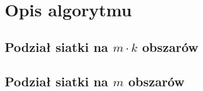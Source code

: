 \newpage


\section{Opis algorytmu}

\newpage
\subsection{Podział siatki na $m \cdot k$ obszarów}

\newpage

\newpage

\newpage

\newpage

\newpage

\newpage

\newpage

\newpage

\newpage

\newpage
\subsection{Podział siatki na $m$ obszarów}

